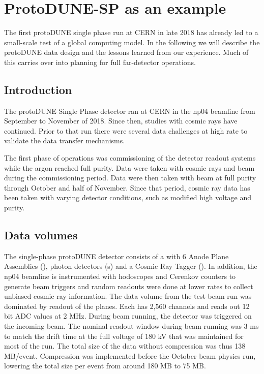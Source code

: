 \section{ProtoDUNE-SP as an example}		
\label{ch:exec-comp-proto-SP}
The first protoDUNE single phase run at CERN in late 2018 has already led to a small-scale test of a global computing model.  In the following we will describe the protoDUNE data design and the lessons learned from our experience. Much of this carries over into planning for full far-detector operations. 

\subsection{Introduction}

The protoDUNE Single Phase detector ran at CERN in the np04 beamline from September to November of 2018. Since then, studies with cosmic rays have continued. Prior to that run there were several data challenges at high rate to validate the data transfer mechanisms. 

The first phase of operations was commissioning of the detector readout systems while the argon reached full purity.  Data were taken with cosmic rays and beam during the commissioning period.  Data were then taken with beam at full purity through October and half of November.  Since that period, cosmic ray data has been taken with varying detector conditions, such as modified high voltage and purity. 



\subsection{Data volumes}
The single-phase protoDUNE detector consists of a  with  6 Anode Plane Assemblies (), photon detectors (s) and a Cosmic Ray Tagger (). In addition, the np04 beamline is instrumented with hodoscopes and Cerenkov counters to generate beam triggers and random readouts were done at lower rates to collect unbiased cosmic ray information. The data volume from the test beam run was dominated by readout of the  planes.  Each  has 2,560 channels and reads out 12 bit ADC values at 2 MHz.  During beam running, the detector was triggered on the incoming beam. The nominal readout window during beam running was  3 ms to match the drift time at the full voltage of 180 kV that was maintained for most of the run.  The total size of the  data without compression was thus 138 MB/event.  Compression was implemented before the October beam physics run, lowering the total size per event from around 180 MB to 75 MB.  

